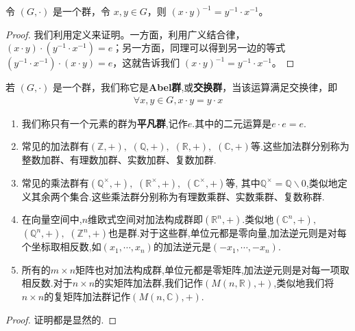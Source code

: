 \documentclass[../../main.tex]{subfiles}
\begin{document}
\begin{proposition}
令 $(G, \cdot)$ 是一个群，令 $x, y \in G$，则 $(x \cdot y)^{-1} = y^{-1} \cdot x^{-1}$。
\end{proposition}
\begin{proof}
我们利用定义来证明。一方面，利用广义结合律，$(x \cdot y) \cdot (y^{-1} \cdot x^{-1}) = e$；另一方面，同理可以得到另一边的等式$(y^{-1} \cdot x^{-1}) \cdot (x \cdot y) = e$，这就告诉我们 $(x \cdot y)^{-1} = y^{-1} \cdot x^{-1}$。 
\end{proof}

\begin{definition}[Abel群]
若 $(G, \cdot)$ 是一个群，我们称它是\textbf{Abel群},或\textbf{交换群}，当该运算满足交换律，即
\begin{align*}
\forall x, y \in G, x \cdot y = y \cdot x
\end{align*} 
\end{definition}

\begin{example}[$\,\,$常见的群]
\begin{enumerate}
\item 我们称只有一个元素的群为\textbf{平凡群},记作${e}$.其中的二元运算是$e\cdot e=e$.
\item 常见的加法群有$(\mathbb{Z},+),$ $(\mathbb{Q},+),$ $(\mathbb{R},+),$ $(\mathbb{C},+)$等.这些加法群分别称为整数加群、有理数加群、实数加群、复数加群.
\item 常见的乘法群有$(\mathbb{Q}^\times,+),$ $(\mathbb{R}^\times,+),$ $(\mathbb{C}^\times,+)$等, 其中$\mathbb{Q}^\times=\mathbb{Q}\backslash {0}$,类似地定义其余两个集合.这些乘法群分别称为有理数乘群、实数乘群、复数称群.
\item 在向量空间中,$n$维欧式空间对加法构成群即$(\mathbb{R}^n,+)$.类似地$(\mathbb{C}^n,+),$ $(\mathbb{Q}^n,+),$ $(\mathbb{Z}^n,+)$也是群.对于这些群,单位元都是零向量,加法逆元则是对每个坐标取相反数,如$(x_1,\cdots,x_n)$的加法逆元是$(-x_1,\cdots,-x_n)$.
\item 所有的$m\times n$矩阵也对加法构成群,单位元都是零矩阵,加法逆元则是对每一项取相反数.对于$n\times n$的实矩阵加法群,我们记作$(M(n,\mathbb{R}),+)$,类似地我们将$n\times n$的复矩阵加法群记作$(M(n,\mathbb{C}),+)$.
\end{enumerate}
\end{example}
\begin{proof}
证明都是显然的.
\end{proof}
\end{document}
